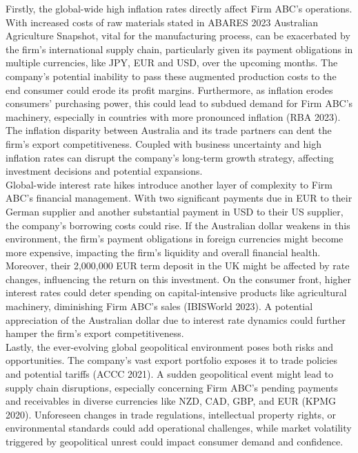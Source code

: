 \documentclass{article}
\begin{document}
\noindent Firstly, the global-wide high inflation rates directly affect Firm ABC's operations. With increased costs of raw materials stated in ABARES 2023 Australian Agriculture Snapshot, vital for the manufacturing process, can be exacerbated by the firm's international supply chain, particularly given its payment obligations in multiple currencies, like JPY, EUR and USD, over the upcoming months. The company's potential inability to pass these augmented production costs to the end consumer could erode its profit margins. Furthermore, as inflation erodes consumers' purchasing power, this could lead to subdued demand for Firm ABC's machinery, especially in countries with more pronounced inflation (RBA 2023). The inflation disparity between Australia and its trade partners can dent the firm's export competitiveness. Coupled with business uncertainty and high inflation rates can disrupt the company's long-term growth strategy, affecting investment decisions and potential expansions.\\

\noindent Global-wide interest rate hikes introduce another layer of complexity to Firm ABC's financial management. With two significant payments due in EUR to their German supplier and another substantial payment in USD to their US supplier, the company's borrowing costs could rise. If the Australian dollar weakens in this environment, the firm's payment obligations in foreign currencies might become more expensive, impacting the firm's liquidity and overall financial health. Moreover, their 2,000,000 EUR term deposit in the UK might be affected by rate changes, influencing the return on this investment. On the consumer front, higher interest rates could deter spending on capital-intensive products like agricultural machinery, diminishing Firm ABC's sales (IBISWorld 2023). A potential appreciation of the Australian dollar due to interest rate dynamics could further hamper the firm's export competitiveness.\\

\noindent Lastly, the ever-evolving global geopolitical environment poses both risks and opportunities. The company's vast export portfolio exposes it to trade policies and potential tariffs (ACCC 2021). A sudden geopolitical event might lead to supply chain disruptions, especially concerning Firm ABC's pending payments and receivables in diverse currencies like NZD, CAD, GBP, and EUR (KPMG 2020). Unforeseen changes in trade regulations, intellectual property rights, or environmental standards could add operational challenges, while market volatility triggered by geopolitical unrest could impact consumer demand and confidence.\\
\end{document}
